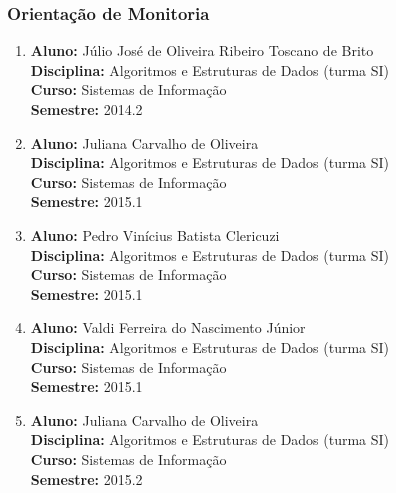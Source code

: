 \documentclass[a4paper,oneside,10pt]{article}
\begin{document}

\subsubsection{Orienta\c{c}\~{a}o de Monitoria}
\vspace{0.3cm}

\begin{enumerate}
\renewcommand{\labelenumi}{{\large\bfseries\arabic{enumi}.}}

\item   \textbf{Aluno:} Júlio José de Oliveira Ribeiro Toscano de Brito \mbox{} \\
        \textbf{Disciplina:}  Algoritmos e Estruturas de Dados (turma SI)\\
        \textbf{Curso:} Sistemas de Informação\\
        \textbf{Semestre:} 2014.2

\item   \textbf{Aluno:} Juliana Carvalho de Oliveira \mbox{} \\
        \textbf{Disciplina:}  Algoritmos e Estruturas de Dados (turma SI)\\
        \textbf{Curso:} Sistemas de Informação\\
        \textbf{Semestre:} 2015.1

\item   \textbf{Aluno:} Pedro Vinícius Batista Clericuzi \mbox{} \\
        \textbf{Disciplina:}  Algoritmos e Estruturas de Dados (turma SI)\\
        \textbf{Curso:} Sistemas de Informação\\
        \textbf{Semestre:} 2015.1

\item   \textbf{Aluno:} Valdi Ferreira do Nascimento Júnior \mbox{} \\
        \textbf{Disciplina:}  Algoritmos e Estruturas de Dados (turma SI)\\
        \textbf{Curso:} Sistemas de Informação\\
        \textbf{Semestre:} 2015.1

\item   \textbf{Aluno:} Juliana Carvalho de Oliveira \mbox{} \\
        \textbf{Disciplina:}  Algoritmos e Estruturas de Dados (turma SI)\\
        \textbf{Curso:} Sistemas de Informação\\
        \textbf{Semestre:} 2015.2


\end{enumerate}
\end{document}
